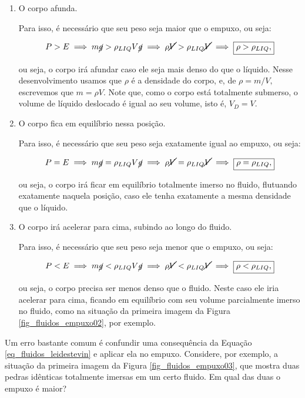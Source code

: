 \begin{enumerate}
    \item [(i)] O corpo afunda.

    Para isso, é necessário que seu peso seja maior que o empuxo, ou seja: 

    $$ P > E \implies m \cancel g > \rho_{LIQ} V \cancel g  \implies \rho \cancel V > \rho_{LIQ} \cancel V  \implies \boxed{\rho > \rho_{LIQ},}$$

    \noindent ou seja, o corpo irá afundar caso ele seja mais denso do que o líquido. Nesse desenvolvimento usamos que $\rho$ é a densidade do corpo, e, de $\rho = m/V,$ escrevemos que $m= \rho V.$ Note que, como o corpo está totalmente submerso, o volume de líquido deslocado é igual ao seu volume, isto é, $V_D = V.$

      \item [(ii)] O corpo fica em equilíbrio nessa posição.

    Para isso, é necessário que seu peso seja exatamente igual ao empuxo, ou seja: 

    $$ P = E \implies m \cancel g = \rho_{LIQ} V \cancel g  \implies \rho \cancel V = \rho_{LIQ} \cancel V  \implies \boxed{\rho = \rho_{LIQ},}$$

    \noindent ou seja, o corpo irá ficar em equilíbrio totalmente imerso no fluido, flutuando exatamente naquela posição, caso ele tenha exatamente a mesma densidade que o líquido.


        \item [(iii)] O corpo irá acelerar para cima, subindo ao longo do fluido.

    Para isso, é necessário que seu peso seja menor que o empuxo, ou seja: 

    $$ P < E \implies m \cancel g < \rho_{LIQ} V \cancel g  \implies \rho \cancel V < \rho_{LIQ} \cancel V  \implies \boxed{\rho < \rho_{LIQ},}$$

    \noindent ou seja, o corpo precisa ser menos denso que o fluido. Neste caso ele iria acelerar para cima, ficando em equilíbrio com seu volume parcialmente imerso no fluido, como na situação da primeira imagem da Figura \ref{fig_fluidos_empuxo02}, por exemplo.
\end{enumerate}










Um erro bastante comum é confundir uma consequência da Equação \eqref{eq_fluidos_leidestevin} e aplicar ela no empuxo. Considere, por exemplo, a situação da primeira imagem da Figura \ref{fig_fluidos_empuxo03}, que mostra duas pedras idênticas totalmente imersas em um certo fluido. Em qual das duas o empuxo é maior?

